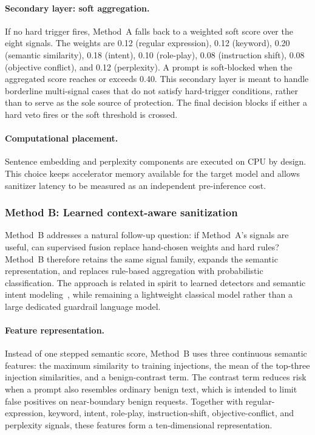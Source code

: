 \paragraph{Secondary layer: soft aggregation.}
If no hard trigger fires, Method~A falls back to a weighted soft score over the eight signals.
The weights are
0.12 (regular expression),
0.12 (keyword),
0.20 (semantic similarity),
0.18 (intent),
0.10 (role-play),
0.08 (instruction shift),
0.08 (objective conflict),
and 0.12 (perplexity).
A prompt is soft-blocked when the aggregated score reaches or exceeds 0.40.
This secondary layer is meant to handle borderline multi-signal cases that do not satisfy hard-trigger conditions, rather than to serve as the sole source of protection.
The final decision blocks if either a hard veto fires or the soft threshold is crossed.

\paragraph{Computational placement.}
Sentence embedding and perplexity components are executed on CPU by design.
This choice keeps accelerator memory available for the target model and allows sanitizer latency to be measured as an independent pre-inference cost.

\subsubsection{Method B: Learned context-aware sanitization}
\label{sec:method-b}

Method~B addresses a natural follow-up question: if Method~A's signals are useful, can supervised fusion replace hand-chosen weights and hard rules?
Method~B therefore retains the same signal family, expands the semantic representation, and replaces rule-based aggregation with probabilistic classification.
The approach is related in spirit to learned detectors and semantic intent modeling~\cite{wang2025promptsleuth,shi2025promptarmor}, while remaining a lightweight classical model rather than a large dedicated guardrail language model.

\paragraph{Feature representation.}
Instead of one stepped semantic score, Method~B uses three continuous semantic features: the maximum similarity to training injections, the mean of the top-three injection similarities, and a benign-contrast term.
The contrast term reduces risk when a prompt also resembles ordinary benign text, which is intended to limit false positives on near-boundary benign requests.
Together with regular-expression, keyword, intent, role-play, instruction-shift, objective-conflict, and perplexity signals, these features form a ten-dimensional representation.

